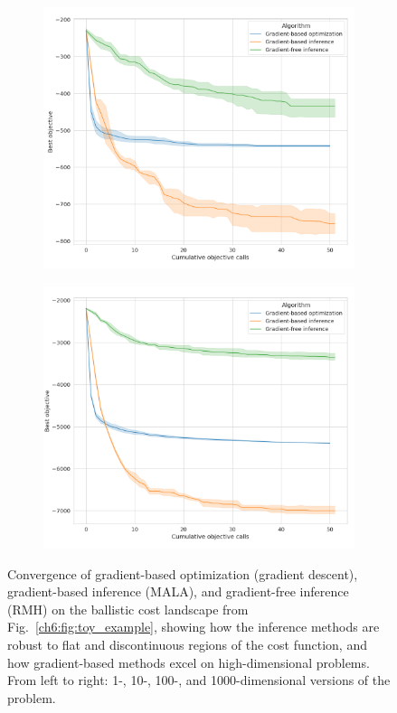 \begin{figure}[tb]
    \begin{subfigure}[t]{0.24\linewidth}
        \centering
        \includegraphics[width=\linewidth]{images/ch6/ballistic_100.png}
    \end{subfigure}
    \begin{subfigure}[t]{0.24\linewidth}
        \centering
        \includegraphics[width=\linewidth]{images/ch6/ballistic_1000.png}
    \end{subfigure}
    \caption{Convergence of gradient-based optimization (gradient descent), gradient-based inference (MALA), and gradient-free inference (RMH) on the ballistic cost landscape from Fig.~\ref{ch6:fig:toy_example}, showing how the inference methods are robust to flat and discontinuous regions of the cost function, and how gradient-based methods excel on high-dimensional problems. From left to right: 1-, 10-, 100-, and 1000-dimensional versions of the problem.}
    \label{ch6:fig:ballistic_convergence}
\end{figure}

